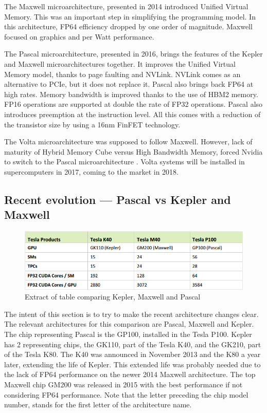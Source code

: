 The Maxwell microarchitecture, presented in 2014 introduced Unified Virtual Memory.
This was an important step in simplifying the programming model.
In this architecture, FP64 efficiency dropped by one order of magnitude.
Maxwell focused on graphics and per Watt performance.

The Pascal microarchitecture, presented in 2016, brings the features of the Kepler and Maxwell microarchitectures together.
It improves the Unified Virtual Memory model, thanks to page faulting and NVLink.
NVLink comes as an alternative to PCIe, but it does not replace it.
Pascal also brings back FP64 at high rates.
Memory bandwidth is improved thanks to the use of HBM2 memory.
FP16 operations are supported at double the rate of FP32 operations.
Pascal also introduces preemption at the instruction level.
All this comes with a reduction of the transistor size by using a 16nm FinFET technology.

The Volta microarchitecture was supposed to follow Maxwell.
However, lack of maturity of Hybrid Memory Cube versus High Bandwidth Memory, forced Nvidia to switch to the Pascal microarchitecture \cite{wccftech:volta}.
Volta systems will be installed in supercomputers in 2017, coming to the market in 2018.

\subsection{Recent evolution --- Pascal vs Kepler and Maxwell}

\begin{figure}[ht!]
    \centering
    \includegraphics[width=\linewidth]{cuda_cores}
    \caption{Extract of table comparing Kepler, Maxwell and Pascal \cite{nvidia:pascalwhitepaper}}
    \label{fig:cuda_cores}
\end{figure}
The intent of this section is to try to make the recent architecture changes clear.
The relevant architectures for this comparison are Pascal, Maxwell and Kepler.
The chip representing Pascal is the GP100, installed in the Tesla P100.
Kepler has 2 representing chips, the GK110, part of the Tesla K40, and the GK210, part of the Tesla K80.
The K40 was announced in November 2013 and the K80 a year later, extending the life of Kepler.
This extended life was probably needed due to the lack of FP64 performance on the newer 2014 Maxwell architecture.
The top Maxwell chip GM200 was released in 2015 with the best performance if not considering FP64 performance.
Note that the letter preceding the chip model number, stands for the first letter of the architecture name.

